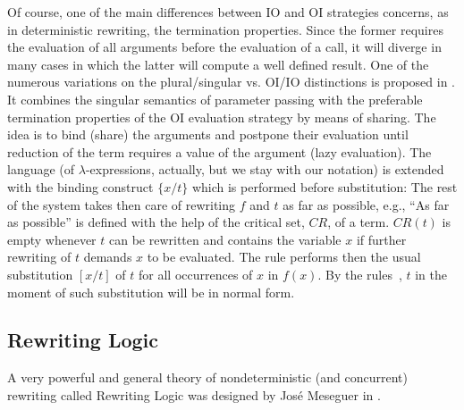 {Of course, one of the main differences between IO and OI strategies
concerns, as in deterministic rewriting, the termination
properties. Since the former requires the evaluation of all arguments
before the evaluation of a call, it will diverge in many cases in
which the latter will compute a well defined result.  One of the
numerous variations on the plural/singular vs. OI/IO distinctions is
proposed in \cite{c:4}. It combines the singular semantics of
parameter passing with the preferable termination properties of the OI
evaluation strategy by means of sharing. The idea is to bind (share)
the arguments and postpone their evaluation until reduction of the
term requires a value of the argument (lazy evaluation). The language
(of $\lambda$-expressions, actually, but we stay with our notation) is
extended with the binding construct $\{x/t\}$ which is performed
before substitution:
The rest of the system takes then care of rewriting $f$ and $t$ as far as possible, e.g., 
``As far as possible'' is defined with the help of the critical set, $CR$, of a term. $CR(t)$ is empty whenever $t$ can 
be rewritten and contains the variable $x$ if further rewriting of $t$ demands $x$ to be evaluated. The rule
\label{eq:bind3} 
performs then the usual substitution $[x/t]$ of $t$ for all 
occurrences of $x$ in $f(x)$. By the rules~, $t$ in the moment of such 
substitution will be in normal form.  

\subsection{Rewriting Logic}\label{sub:RL}
A very powerful and general theory of nondeterministic (and concurrent) rewriting called Rewriting Logic 
was designed by Jos\'{e} Meseguer in \cite{c:87, c:86}. 

}

